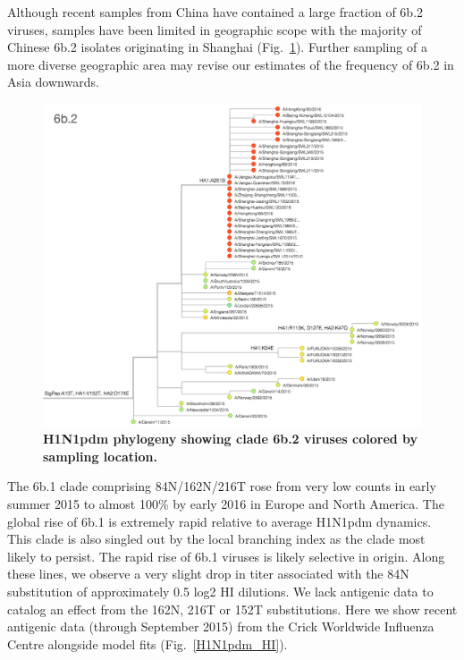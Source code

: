 \documentclass[11pt,oneside,letterpaper]{article}
\begin{document}
\pagebreak

Although recent samples from China have contained a large fraction of 6b.2 viruses, samples have been limited in geographic scope with the majority of Chinese 6b.2 isolates originating in Shanghai (Fig.\ \ref{H1N1pdm_6b2_tree}). Further sampling of a more diverse geographic area may revise our estimates of the frequency of 6b.2 in Asia downwards.

\begin{figure}[H]
	\centering		
	\includegraphics[width=1.0\textwidth]{../figures/feb-2016/H1N1pdm_6b2_tree.png}
	\caption{\textbf{H1N1pdm phylogeny showing clade 6b.2 viruses colored by sampling location.} 
	}
	\label{H1N1pdm_6b2_tree}
\end{figure}

\pagebreak

The 6b.1 clade comprising 84N/162N/216T rose from very low counts in early summer 2015 to almost 100\% by early 2016 in Europe and North America. The global rise of 6b.1 is extremely rapid relative to average H1N1pdm dynamics. This clade is also singled out by the local branching index \cite{neher2014predicting} as the clade most likely to persist. The rapid rise of 6b.1 viruses is likely selective in origin. Along these lines, we observe a very slight drop in titer associated with the 84N substitution of approximately 0.5 log2 HI dilutions. We lack antigenic data to catalog an effect from the 162N, 216T or 152T substitutions. Here we show recent antigenic data (through September 2015) from the Crick Worldwide Influenza Centre alongside model fits \cite{neher2015prediction} (Fig.\ \ref{H1N1pdm_HI}).
\end{document}
